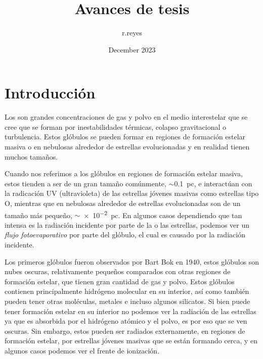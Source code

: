 \documentclass{book}
\title{Avances de tesis}
\author{r.reyes }
\date{December 2023}
\begin{document}
\maketitle

\tableofcontents

\newpage

\chapter{Introducción}

Los  son grandes concentraciones de gas y polvo en el medio interestelar que se cree que se forman por inestabilidades térmicas, colapso gravitacional o turbulencia. Estos glóbulos se pueden formar en regiones de formación estelar masiva o en nebulosas alrededor de estrellas evolucionadas y en realidad tienen muchos tamaños.

Cuando nos referimos a los glóbulos en regiones de formación estelar masiva, estos tienden a ser de un gran tamaño comúnmente, $\sim$\SI{0.1}{pc}, e interactúan con la radicación UV (ultravioleta) de las estrellas jóvenes masivas como estrellas tipo O, mientras que en nebulosas alrededor de estrellas evolucionadas son de un tamaño más pequeño, $\sim$\SI{e-2}{pc}. En algunos casos dependiendo que tan intensa es la radiación incidente por parte de la o las estrellas, podemos ver un \textit{flujo fotoevaporativo} por parte del glóbulo, el cual es causado por la radiación incidente.

Los primeros glóbulos fueron observados por Bart Bok en 1940, estos glóbulos son nubes oscuras, relativamente pequeños comparados con otras regiones de formación estelar, que tienen gran cantidad de gas y polvo. Estos glóbulos contienen principalmente hidrógeno molecular en su interior, así como también pueden tener otras moléculas, metales e incluso algunos silicatos. Si bien puede tener formación estelar en su interior no podemos ver la radiación de las estrellas ya que es absorbida por el hidrógeno atómico y el polvo, es por eso que se ven oscuras. Sin embargo, estos pueden ser radiados externamente, en regiones de formación estelar, por estrellas jóvenes masivas que se están formando cerca, y en algunos casos podemos ver el frente de ionización.
\end{document}

